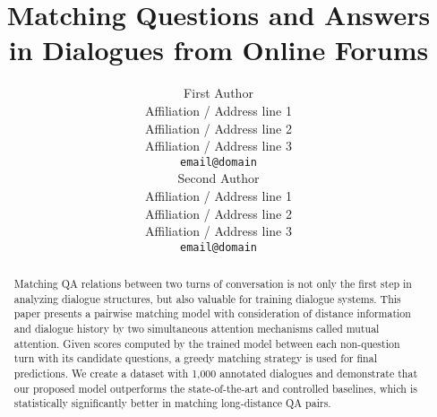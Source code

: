 \documentclass[11pt,a4paper]{article}
\title{Matching Questions and Answers in Dialogues from Online Forums}
\author{First Author \\
  Affiliation / Address line 1 \\
  Affiliation / Address line 2 \\
  Affiliation / Address line 3 \\
  {\tt email@domain} \\\And
  Second Author \\
  Affiliation / Address line 1 \\
  Affiliation / Address line 2 \\
  Affiliation / Address line 3 \\
  {\tt email@domain} \\}
\date{}
\renewcommand\appendix{\setcounter{secnumdepth}{-2}}
\newcommand{\KZ}[1]{\textcolor{red}{Kenny: #1}}
\begin{document}
\maketitle
\begin{abstract}
  
 
Matching QA relations between two turns of conversation is not only 
the first step in analyzing dialogue structures, 
but also valuable for training dialogue systems. 
This paper presents a pairwise matching model with consideration 
of distance information and dialogue history by two simultaneous attention 
mechanisms called mutual attention. 
Given scores computed by the trained model between each non-question 
turn with its candidate questions, a greedy matching strategy 
is used for final predictions. We create a dataset with 1,000 
annotated dialogues and demonstrate that our proposed model outperforms 
the state-of-the-art and controlled baselines, which is statistically significantly 
better in matching long-distance QA pairs. 
  
\end{abstract}






















\appendix

%
\end{document}
